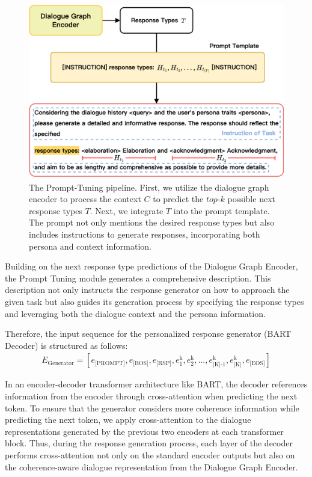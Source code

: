 \begin{figure}[ht]
    \centering
    \includegraphics[width=1.00\textwidth]{./context/methodology/images/generator_prompt.png}
    \caption{The Prompt-Tuning pipeline. First, we utilize the dialogue graph encoder to process the context $C$ to predict the $top\text{-}k$ possible next response types $T$. Next, we integrate $T$ into the prompt template. The prompt not only mentions the desired response types but also includes instructions to generate responses, incorporating both persona and context information.}
    \label{fig:generator_prompt}
\end{figure}

Building on the next response type predictions of the Dialogue Graph Encoder, the Prompt Tuning module generates a comprehensive description. This description not only instructs the response generator on how to approach the given task but also guides its generation process by specifying the response types and leveraging both the dialogue context and the persona information.

Therefore, the input sequence for the personalized response generator (BART Decoder) is structured as follows:
\begin{align*}
    E_{\text{Generator}} = [e_{\text{[PROMPT]}}, e_{\text{[BOS]}}, e_{\text{[RSP]}}, e_{\text{1}}^{\text{k}}, e_{\text{2}}^{\text{k}}, ... , e_{\text{|K|-1}}^{\text{k}}, e_{\text{|K|}}^{\text{k}}, e_{\text{[EOS]}}]
\end{align*}

In an encoder-decoder transformer architecture like BART, the decoder references information from the encoder through cross-attention when predicting the next token. To ensure that the generator considers more coherence information while predicting the next token, we apply cross-attention to the dialogue representations generated by the previous two encoders at each transformer block. Thus, during the response generation process, each layer of the decoder performs cross-attention not only on the standard encoder outputs but also on the coherence-aware dialogue representation from the Dialogue Graph Encoder.

